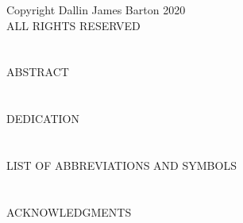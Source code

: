 \documentclass[a4paper,12pt,openany]{report} %
\renewcommand*{\glsclearpage}{\clearpage}
\begin{document}
\restoregeometry		
	\newpage
	\thispagestyle{empty}
	\vspace*{\fill}
	\begin{center}
		\singlespacing
		Copyright Dallin James Barton 2020\\
		ALL RIGHTS RESERVED
	\end{center}
	\chapter*{}


	\begin{center}
		\vspace{-0.5in}
		ABSTRACT
	\end{center}
		
	\chapter*{}
		
	\vspace{-0.5in}
	\begin{center}
		DEDICATION
		
	\end{center}
	
	
	
	\chapter*{}
	\vspace{-0.5in}
	\begingroup
	\let\clearpage\relax
	\begin{center}
		LIST OF ABBREVIATIONS AND SYMBOLS 
	\end{center}
		\vspace{-1in}
		\renewcommand{\glossaryname}{}
		\renewcommand*{\glsnamefont}[1]{\textmd{#1}}
		\glstocfalse
		\nopagebreak
		\printglossaries
		\glsresetall
	\endgroup

	

	\chapter*{}
	\vspace{-0.7in}
	\begin{center}
		ACKNOWLEDGMENTS
		
	\end{center}
\end{document}
